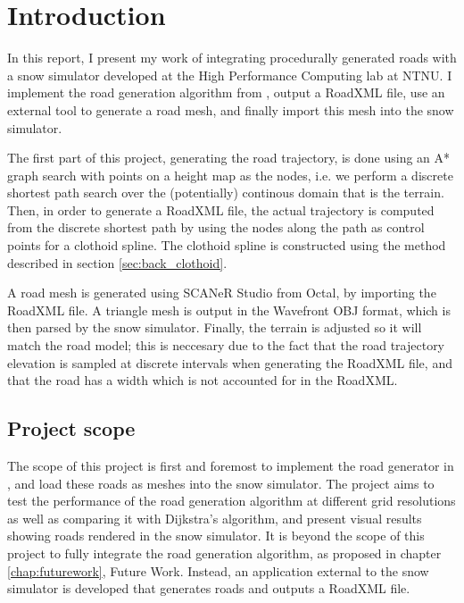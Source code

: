 \chapter{Introduction}
\label{chap:introduction}
In this report, I present my work of integrating procedurally generated roads with a snow simulator developed at the High Performance Computing lab at NTNU. I implement the road generation algorithm from \cite{roadgen}, output a RoadXML file\cite{roadxml}, use an external tool to generate a road mesh, and finally import this mesh into the snow simulator. 

The first part of this project, generating the road trajectory, is done using an A* graph search with points on a height map as the nodes, i.e. we perform a discrete shortest path search over the (potentially) continous domain that is the terrain. Then, in order to generate a RoadXML file, the actual trajectory is computed from the discrete shortest path by using the nodes along the path as control points for a clothoid spline. The clothoid spline is constructed using the method described in section \ref{sec:back_clothoid}.

A road mesh is generated using SCANeR Studio from Octal, by importing the RoadXML file. A triangle mesh is output in the Wavefront OBJ format, which is then parsed by the snow simulator. Finally, the terrain is adjusted so it will match the road model; this is neccesary due to the fact that the road trajectory elevation is sampled at discrete intervals when generating the RoadXML file, and that the road has a width which is not accounted for in the RoadXML.

\section{Project scope}
\label{sec:project-scope} 
The scope of this project is first and foremost to implement the road generator in \cite{roadgen}, and load these roads as meshes into the snow simulator. The project aims to test the performance of the road generation algorithm at different grid resolutions as well as comparing it with Dijkstra's algorithm, and present visual results showing roads rendered in the snow simulator. It is beyond the scope of this project to fully integrate the road generation algorithm, as proposed in chapter \ref{chap:futurework}, Future Work. Instead, an application external to the snow simulator is developed that generates roads and outputs a RoadXML file.

